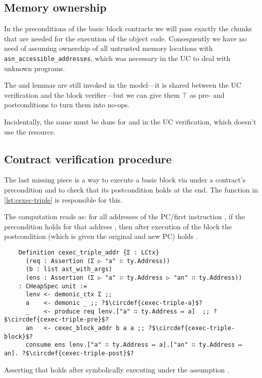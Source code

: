 \subsection{Memory ownership}

In the preconditions of the basic block contracts we will pass exactly the  chunks that are needed for the execution of the object code. Consequently we have no need of assuming ownership of all untrusted memory locations with \texttt{asn\_ac\-ces\-si\-ble\_ad\-dresses}, which was necessary in the UC to deal with unknown programs.

The  and  lemmas are still invoked in the \usail model---it is shared between the UC verification and the block verifier---but we can give them \(\top\) as pre- and postconditions to turn them into no-ops.

Incidentally, the same must be done for  and  in the UC verification, which doesn't use the  resource.

\subsection{Contract verification procedure}

The last missing piece is a way to execute a basic block via  under a contract's precondition and to check that its postcondition holds at the end. The function  in \cref{lst:cexec-triple} is responsible for this.

The computation reads as: for all addresses of the PC/first instruction , if the precondition holds for that address , then after execution of the block  the postcondition (which is given the original and new PC) holds .

\begin{listing}[H]
  \startcstep
  \begin{verbatim}
    Definition cexec_triple_addr {Σ : LCtx}
      (req : Assertion (Σ ▷ "a" ∷ ty.Address))
      (b : list ast_with_args)
      (ens : Assertion (Σ ▷ "a" ∷ ty.Address ▷ "an" ∷ ty.Address))
    : CHeapSpec unit :=
      lenv <- demonic_ctx Σ ;;
      a    <- demonic _ ;; ?$\circdef{cexec-triple-a}$?
      _    <- produce req lenv.["a" ∷ ty.Address ↦ a]  ;; ?$\circdef{cexec-triple-pre}$?
      an   <- cexec_block_addr b a a ;; ?$\circdef{cexec-triple-block}$?
      consume ens lenv.["a" ∷ ty.Address ↦ a].["an" ∷ ty.Address ↦ an]. ?$\circdef{cexec-triple-post}$?
  \end{verbatim}
  \caption{Asserting that  holds after symbolically executing  under the assumption .}
  \label{lst:cexec-triple}
\end{listing}

